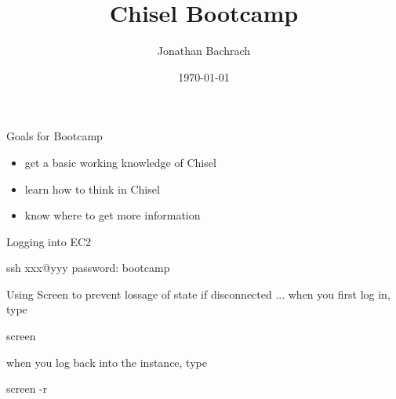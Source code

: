 \documentclass[xcolor=pdflatex,dvipsnames,table]{beamer}
\title{Chisel Bootcamp}
\author{Jonathan Bachrach}
\date{\today}
\institute[UC Berkeley]{EECS UC Berkeley}
\begin{document}
\begin{frame}
\titlepage
\end{frame}
\addtocounter{framenumber}{-1}

% 
% 
% 

\begin{frame}[fragile]{Goals for Bootcamp}

\begin{itemize}
\item get a basic working knowledge of Chisel
\item learn how to think in Chisel
\item know where to get more information
\end{itemize}

\end{frame}

\begin{frame}[fragile]{Logging into EC2}

\begin{scala}
ssh xxx@yyy
password: bootcamp
\end{scala}

\end{frame}

\begin{frame}[fragile]{Using Screen}
to prevent lossage of state if disconnected ... when you first log in, type
\begin{scala}
screen
\end{scala}

when you log back into the instance, type
\begin{scala}
screen -r
\end{scala}

\end{frame}
\end{document}
